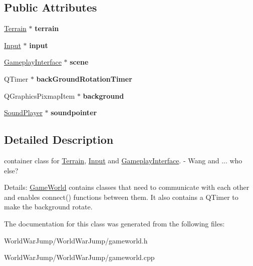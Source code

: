 \subsection*{Public Attributes}
\begin{DoxyCompactItemize}
\item 
\hyperlink{class_terrain}{Terrain} $\ast$ {\bfseries terrain}\hypertarget{class_game_world_a97a0e2bf2693f10e7ab7481ada618191}{}\label{class_game_world_a97a0e2bf2693f10e7ab7481ada618191}

\item 
\hyperlink{class_input}{Input} $\ast$ {\bfseries input}\hypertarget{class_game_world_af51a9a6f7f2f318a7f4842bc7ddddf67}{}\label{class_game_world_af51a9a6f7f2f318a7f4842bc7ddddf67}

\item 
\hyperlink{class_gameplay_interface}{Gameplay\+Interface} $\ast$ {\bfseries scene}\hypertarget{class_game_world_a470317d29e5b698b1e08dc983d78ff50}{}\label{class_game_world_a470317d29e5b698b1e08dc983d78ff50}

\item 
Q\+Timer $\ast$ {\bfseries back\+Ground\+Rotation\+Timer}\hypertarget{class_game_world_a12fff5decf2e34382c409923ec6f4668}{}\label{class_game_world_a12fff5decf2e34382c409923ec6f4668}

\item 
Q\+Graphics\+Pixmap\+Item $\ast$ {\bfseries background}\hypertarget{class_game_world_a42c3f3a06320763c952771c93f49489d}{}\label{class_game_world_a42c3f3a06320763c952771c93f49489d}

\item 
\hyperlink{class_sound_player}{Sound\+Player} $\ast$ {\bfseries soundpointer}\hypertarget{class_game_world_a133678d6bc4754bff909f0e744923549}{}\label{class_game_world_a133678d6bc4754bff909f0e744923549}

\end{DoxyCompactItemize}


\subsection{Detailed Description}
container class for \hyperlink{class_terrain}{Terrain}, \hyperlink{class_input}{Input} and \hyperlink{class_gameplay_interface}{Gameplay\+Interface}. -\/ Wang and ... who else? 

Details\+: \hyperlink{class_game_world}{Game\+World} contains classes that need to communicate with each other and enables connect() functions between them. It also contains a Q\+Timer to make the background rotate. 

The documentation for this class was generated from the following files\+:\begin{DoxyCompactItemize}
\item 
World\+War\+Jump/\+World\+War\+Jump/gameworld.\+h\item 
World\+War\+Jump/\+World\+War\+Jump/gameworld.\+cpp\end{DoxyCompactItemize}
